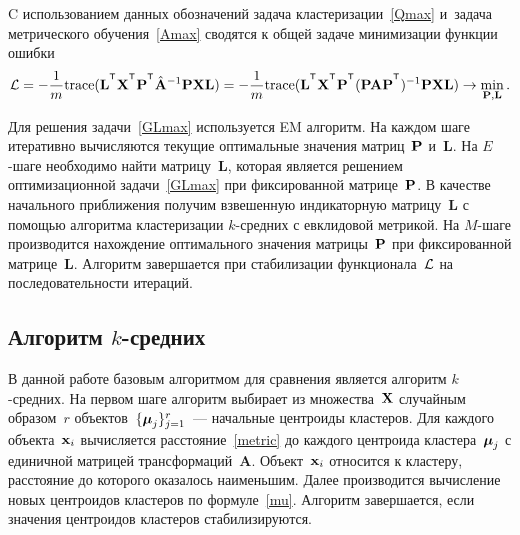 \begin{theorem}
	C использованием данных обозначений задача кластеризации~\eqref{Qmax}
	и~задача метрического обучения~\eqref{Amax} сводятся к общей задаче минимизации функции ошибки~\cite{ding2005equivalence}
	\begin{equation}
	\label{GLmax}
	\cL = -\frac{1}{m} \text{trace} (\mathbf{L}^{\T} \bX^{\T} \bP^{\T} \hat{\mathbf{A}}^{-1} \bP \bX \mathbf{L}) = - \frac{1}{m} \text{trace} (\mathbf{L}^{\T} \bX^{\T} \bP^{\T}
	(\bP \mathbf{A} \bP^{\T})^{-1} \bP \bX \mathbf{L}) \to \min_{\bP, \mathbf{L}}.
	\end{equation}
\end{theorem}

Для решения задачи~\eqref{GLmax} используется EM алгоритм.
На каждом шаге итеративно вычисляются текущие оптимальные значения матриц~$\mathbf{P}$ и~$\mathbf{L}$.
На $E$-шаге необходимо найти матрицу~$\mathbf{L}$, которая является решением оптимизационной задачи~\eqref{GLmax} при фиксированной матрице~$\mathbf{P}$.
В качестве начального приближения получим взвешенную индикаторную матрицу~$\mathbf{L}$ с помощью алгоритма кластеризации $k$-средних с евклидовой метрикой.
На $M$-шаге производится нахождение оптимального значения матрицы~$\mathbf{P}$ при фиксированной матрице~$\mathbf{L}$.
Алгоритм завершается при стабилизации функционала~$\mathcal{L}$ на последовательности итераций.

\subsection*{Алгоритм $k$-средних}
В данной работе базовым алгоритмом для сравнения является алгоритм $k$-средних.
На первом шаге алгоритм выбирает из множества~$\mathbf{X}$ случайным образом~$r$ объектов~$\{\boldsymbol{\mu}_j\}_{j=1}^r$~--- начальные центроиды кластеров.
Для каждого объекта~$\mathbf{x}_i$ вычисляется расстояние~\eqref{metric} до каждого центроида кластера~$\boldsymbol{\mu}_j$ с единичной матрицей трансформаций~$\mathbf{A}$.
Объект~$\mathbf{x}_i$ относится к кластеру, расстояние до которого оказалось наименьшим.
Далее производится вычисление новых центроидов кластеров по формуле~\eqref{mu}.
Алгоритм завершается, если значения центроидов кластеров стабилизируются.


